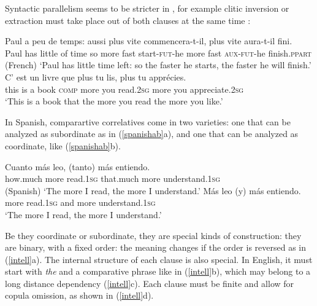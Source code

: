 \documentclass[output=paper
                ,modfonts
                ,nonflat
	        ,collection
	        ,collectionchapter
	        ,collectiontoclongg
 	        ,biblatex
                ,babelshorthands
                ,newtxmath
                ,draftmode
                ,colorlinks, citecolor=brown
]{./langsci/langscibook}
\begin{document}
{Syntactic parallelism seems to be stricter in , for example clitic inversion or extraction
must take place out of both clauses at the same time \citep[]{Abeille:Borsley:08}:

\begin{exe}
 \ex
\begin{xlista}
\ex 
\gll Paul a     peu  de temps: aussi plus  vite commencera-t-il,  plus   vite  aura-t-il  fini.\\
     Paul has little of time so more fast start-\textsc{fut}-he more fast  \textsc{aux}-\textsc{fut}-he finish.\textsc{ppart} \\\hfill{(French)}
\glt `Paul has little time left: so the faster he starts, the faster he will finish.'
\ex \gll C'   est un livre  que      plus   tu    lis, plus  tu    appr\'{e}cies. \\
this is    a  book \textsc{comp} more you read.2\textsc{sg}  more you appreciate.2\textsc{sg} \\
\glt `This is a book that the more you read the more you like.'
\end{xlista}
\end{exe}

In Spanish, comparartive correlatives come in two varieties: one that can be analyzed as subordinate
as in (\ref{spanishab}a), 
 and one that can be analyzed as coordinate, like  (\ref{spanishab}b).

\begin{exe}
 \ex
\begin{xlista}
\ex 
\gll Cuanto   m\'{a}s leo,     (tanto)        m\'{a}s entiendo. \\
     how.much more    read.1\textsc{sg} that.much more understand.1\textsc{sg} \\\hfill{(Spanish)}
\glt `The more I read, the more I understand.'
\ex 
\gll	M\'{a}s leo        (y) m\'{a}s entiendo. \\
	more read.1\textsc{sg} and more understand.1\textsc{sg} \\
\glt `The more I read, the more I understand.'\\ 
 \citep[]{Abeille:Borsley:Espinal:06}
\end{xlista}\label{spanishab}
\end{exe}

Be they coordinate or subordinate, they are special kinds of construction: they are binary, with a fixed order: the meaning changes if the order is reversed
as in (\ref{intell}a).
The internal structure of each clause is also special. In English, it must start with \emph{the} and a comparative phrase like in (\ref{intell}b), which may belong to a long distance dependency 
(\ref{intell}c). Each clause must be finite and allow for copula omission, as shown in (\ref{intell}d).

}
\end{document}
